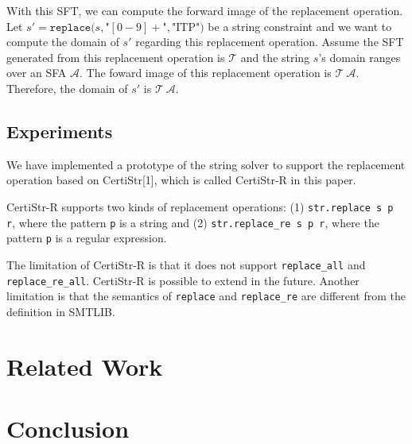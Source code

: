\documentclass[a4paper,UKenglish,cleveref, autoref, thm-restate]{lipics-v2021}
\begin{document}
  With this SFT, we can compute the forward image of the replacement operation.
  Let $s' = \texttt{replace}(s, $"$[0-9]+$"$, $"$\text{ITP}$"$)$ be a string constraint and we want to compute the domain of $s'$ regarding this replacement operation.
  Assume the SFT generated from this replacement operation is $\mathcal{T}$ and the string $s$'s domain ranges over an SFA $\mathcal{A}$. The foward image of this replacement operation is $\mathcal{T}~\mathcal{A}$. Therefore, the domain of $s'$ is $\mathcal{T}~\mathcal{A}$.





\subsection{Experiments}

We have implemented a prototype of the string solver to support the replacement operation based on CertiStr[1], which is called CertiStr-R in this paper.

CertiStr-R supports two kinds of replacement operations: (1) \texttt{str.replace s p r}, where the pattern \texttt{p} is a string and (2) \texttt{str.replace\_re s p r}, where the pattern \texttt{p} is a regular expression. 


The limitation of CertiStr-R is that it does not support \texttt{replace\_all} and \texttt{replace\_re\_all}. CertiStr-R is possible to extend in the future. Another limitation is that the semantics of \texttt{replace} and \texttt{replace\_re} are different from the definition in SMTLIB.

\section{Related Work}

\section{Conclusion}
\end{document}
